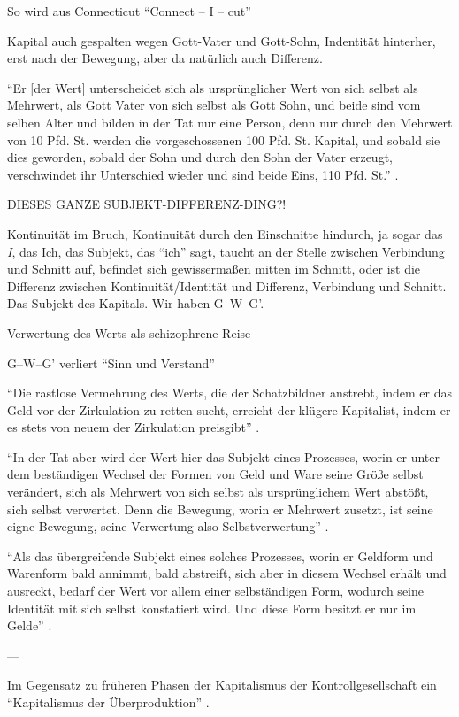 \documentclass[12pt,
               DIV13,
               paper=a4,
               twoside=false,
               onehalfspacing,
               bibliography=totoc,
               toc=graduated,
               draft,
               ]{scrartcl}
\newcommand{\pc}[2]{\parencite[#1]{#2}}
\newcommand{\gwg}{G--W--G'\xspace}
\begin{document}
So wird aus Connecticut "`Connect -- I -- cut"' \pc{48}{ao}

Kapital auch gespalten wegen Gott-Vater und Gott-Sohn, Indentität
hinterher, erst nach der Bewegung, aber da natürlich auch Differenz.

"`Er [der Wert] unterscheidet sich als ursprünglicher Wert von sich
selbst als Mehrwert, als Gott Vater von sich selbst als Gott Sohn, und
beide sind vom selben Alter und bilden in der Tat nur eine Person,
denn nur durch den Mehrwert von 10 Pfd. St. werden die vorgeschossenen
100 Pfd. St. Kapital, und sobald sie dies geworden, sobald der Sohn
und durch den Sohn der Vater erzeugt, verschwindet ihr Unterschied
wieder und sind beide Eins, 110 Pfd. St."' \pc{S. 169 f.}{kap}.

DIESES GANZE SUBJEKT-DIFFERENZ-DING?!

Kontinuität im Bruch, Kontinuität durch den Einschnitte hindurch, ja
sogar das \emph{I}, das Ich, das Subjekt, das "`ich"' sagt, taucht an
der Stelle zwischen Verbindung und Schnitt auf, befindet sich
gewissermaßen mitten im Schnitt, oder ist die Differenz zwischen
Kontinuität/Identität und Differenz, Verbindung und Schnitt. Das
Subjekt des Kapitals. Wir haben \gwg.

Verwertung des Werts als schizophrene Reise

\gwg verliert "`Sinn und Verstand"' \pc{166}{kap}

"`Die rastlose Vermehrung des Werts, die der Schatzbildner anstrebt,
indem er das Geld vor der Zirkulation zu retten sucht, erreicht der
klügere Kapitalist, indem er es stets von neuem der Zirkulation
preisgibt"' \pc{168}{kap}.

"`In der Tat aber wird der Wert hier das Subjekt eines Prozesses,
worin er unter dem beständigen Wechsel der Formen von Geld und Ware
seine Größe selbst verändert, sich als Mehrwert von sich selbst als
ursprünglichem Wert abstößt, sich selbst verwertet. Denn die Bewegung,
worin er Mehrwert zusetzt, ist seine eigne Bewegung, seine Verwertung
also Selbstverwertung"' \pc{169}{kap}.

"`Als das übergreifende Subjekt eines solches Prozesses, worin er
Geldform und Warenform bald annimmt, bald abstreift, sich aber in
diesem Wechsel erhält und ausreckt, bedarf der Wert vor allem einer
selbständigen Form, wodurch seine Identität mit sich selbst
konstatiert wird. Und diese Form besitzt er nur im Gelde"'
\pc{169}{kap}.

---

Im Gegensatz zu früheren Phasen der Kapitalismus der
Kontrollgesellschaft ein "`Kapitalismus der Überproduktion"'
\pc{259}{ps}.
\end{document}
